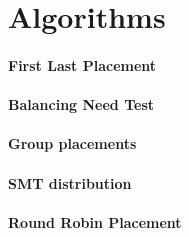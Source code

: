 \section{Algorithms}
\label{impl:algos}

\paragraph{First Last Placement}
\paragraph{Balancing Need Test}
\paragraph{Group placements}
\paragraph{SMT distribution}
\paragraph{Round Robin Placement}
